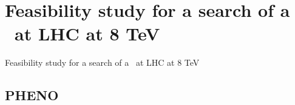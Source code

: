 \section[Pheno]{Feasibility study for a search of a \Tp~at LHC at 8 TeV}
\setcounter{tocdepth}{2}

\begin{frame}
\begin{center}
Feasibility study for a search of a \Tp~at LHC at 8 TeV
\end{center}
\end{frame}

\subsection{PHENO}

